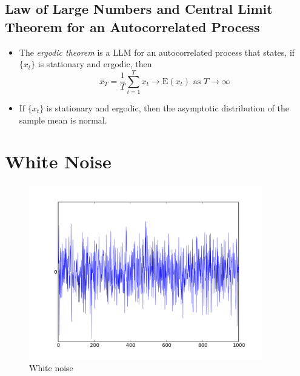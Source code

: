 \documentclass[11pt]{article}
\begin{document}
\subsection{Law of Large Numbers and Central Limit Theorem for an Autocorrelated Process}
\begin{itemize}
    \item The \textit{ergodic theorem} is a LLM for an autocorrelated process that states, if 
    $\{x_t\}$ is stationary and ergodic, then 
    \[\bar{x}_T= \frac{1}{T} \sum_{t=1}^{T} x_t \rightarrow \text{E}(x_t) \text{ as } T 
    \rightarrow \infty\]
    \item If $\{x_t\}$ is stationary and ergodic, then the asymptotic distribution of the 
    sample mean is normal.
\end{itemize}

\section{White Noise}

\begin{figure}[H] 
    \centering 
    \includegraphics[width=4in]{imgs/white_noise.png}
    \caption{White noise}
\end{figure}
\end{document}
